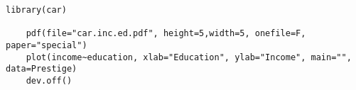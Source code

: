 \begin{lstlisting}[breaklines=true]
    library(car)

    pdf(file="car.inc.ed.pdf", height=5,width=5, onefile=F, paper="special")
    plot(income~education, xlab="Education", ylab="Income", main="", data=Prestige)
    dev.off()
\end{lstlisting}
